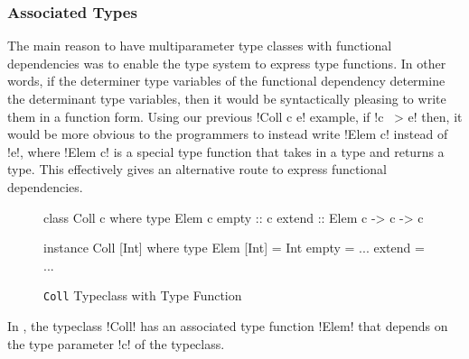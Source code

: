 \documentclass[manuscript,screen,nonacm]{acmart}
\begin{document}
\subsubsection{Associated Types}
The main reason to have multiparameter type classes with functional dependencies was to enable the type system to express type functions. In other words, if the determiner type variables of the functional dependency determine the determinant type variables, then it would be syntactically pleasing to write them in a function form.
Using our previous !Coll c e! example, if !c ~> e! then, it would be more obvious to the programmers to instead write !Elem c! instead of !e!, where !Elem c! is a special type function that takes in a type and returns a type. This effectively gives an alternative route to express functional dependencies.
\begin{figure}[ht]
  \begin{center}
    \begin{minipage}[ht]{0.4\linewidth}
      \begin{code}
        class Coll c where
           type Elem c
           empty :: c
           extend :: Elem c -> c -> c
      \end{code}
    \end{minipage}%
    \begin{minipage}[ht]{0.4\linewidth}
      \begin{code}
        instance Coll [Int] where
           type Elem [Int] = Int
           empty = ...
           extend = ...
      \end{code}
    \end{minipage}
  \end{center}
  \caption[Coll typeclass]{\lstinline{Coll} Typeclass with Type Function}
  \label{fig:type-fam}
\end{figure}

In , the typeclass !Coll! has an associated type function !Elem! that depends on the type parameter !c! of the typeclass. 
\end{document}
